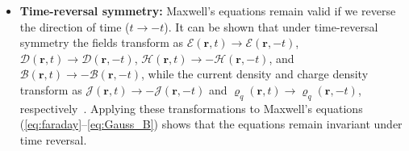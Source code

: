 \begin{itemize}


        \item \textbf{Time-reversal symmetry:} Maxwell's equations remain valid if
              we reverse the direction of time ($t\to-t$). It can be shown that under
              time-reversal symmetry
              the fields transform as
              $\bm{\mathcal{E}}(\mathbf{r}, t)\to\bm{\mathcal{E}}(\mathbf{r}, -t)$,
              $\bm{\mathcal{D}}(\mathbf{r}, t)\to\bm{\mathcal{D}}(\mathbf{r}, -t)$,
              $\bm{\mathcal{H}}(\mathbf{r},
                  t)\to-\bm{\mathcal{H}}(\mathbf{r}, -t)$, and $\bm{\mathcal{B}}(\mathbf{r},
                  t)\to-\bm{\mathcal{B}}(\mathbf{r}, -t)$, while the current density and charge
              density transform as
              $\bm{\mathcal{J}}(\mathbf{r},
                  t)\to-\bm{\mathcal{J}}(\mathbf{r}, -t)$ and $\varrho_q(\mathbf{r},
                  t)\to \varrho_q (\mathbf{r}, -t)$, respectively~\cite{reciprocity}.
              Applying these transformations
              to Maxwell's equations (\eqref{eq:faraday}--\eqref{eq:Gauss_B}) shows
              that the equations remain invariant under time reversal. 
              

\end{itemize}
